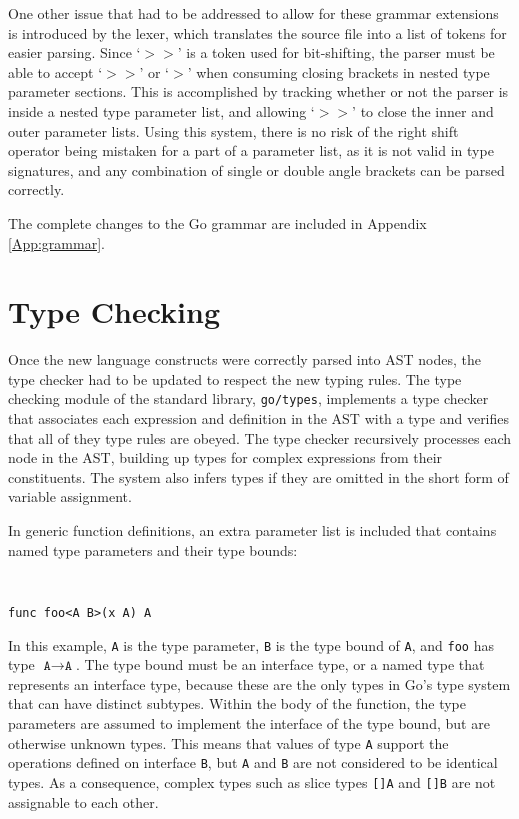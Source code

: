 \documentclass[letterpaper,twocolumn,11pt]{article}
\begin{document}
One other issue that had to be addressed to allow for these grammar extensions is introduced by the lexer, which translates the source file into a list of tokens for easier parsing. Since `\textbf{$>>$}' is a token used for bit-shifting, the parser must be able to accept `\textbf{$>>$}' or  `\textbf{$>$}' when consuming closing brackets in nested type parameter sections. This is accomplished by tracking whether or not the parser is inside a nested type parameter list, and allowing  `\textbf{$>>$}' to close the inner and outer parameter lists. Using this system, there is no risk of the right shift operator being mistaken for a part of a parameter list, as it is not valid in type signatures, and any combination of single or double angle brackets can be parsed correctly.

The complete changes to the Go grammar are included in Appendix \ref{App:grammar}.

\section{Type Checking} \label{type_checking}

Once the new language constructs were correctly parsed into AST nodes, the type checker had to be updated to respect the new typing rules. The type checking module of the standard library, \texttt{go/types}, implements a type checker that associates each expression and definition in the AST with a type and verifies that all of they type rules are obeyed. The type checker recursively processes each node in the AST, building up types for complex expressions from their constituents. The system also infers types if they are omitted in the short form of variable assignment. 

In generic function definitions, an extra parameter list is included that contains named type parameters and their type bounds:

{ \tt \small
\begin{verbatim}
func foo<A B>(x A) A
\end{verbatim}
}

In this example, \texttt{A} is the type parameter, \texttt{B} is the type bound of \texttt{A}, and \texttt{foo} has type $\texttt{A} \rightarrow \texttt{A}$. The type bound must be an interface type, or a named type that represents an interface type, because these are the only types in Go's type system that can have distinct subtypes. Within the body of the function, the type parameters are assumed to implement the interface of the type bound, but are otherwise unknown types. This means that values of type \texttt{A} support the operations defined on interface \texttt{B}, but \texttt{A} and \texttt{B} are not considered to be identical types. As a consequence, complex types such as slice types \texttt{[]A} and \texttt{[]B} are not assignable to each other.
\end{document}
